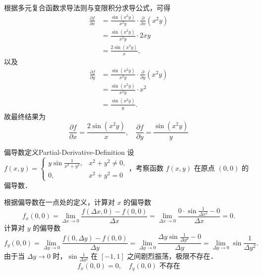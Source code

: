 \begin{solution}
    根据多元复合函数求导法则与变限积分求导公式，可得
    \begin{equation}
        \begin{aligned}
            \frac{\partial f}{\partial x} & = \frac{\sin(x^2 y)}{x^2 y} \cdot \frac{\partial}{\partial x}(x^2 y) \\
                                          & = \frac{\sin(x^2 y)}{x^2 y} \cdot 2xy                                \\
                                          & = \frac{2 \sin(x^2 y)}{x},
        \end{aligned}
    \end{equation}
    以及
    \begin{equation}
        \begin{aligned}
            \frac{\partial f}{\partial y} & = \frac{\sin(x^2 y)}{x^2 y} \cdot \frac{\partial}{\partial y}(x^2 y) \\
                                          & = \frac{\sin(x^2 y)}{x^2 y} \cdot x^2                                \\
                                          & = \frac{\sin(x^2 y)}{y}.
        \end{aligned}
    \end{equation}
    故最终结果为
    \begin{equation}
        \boxed{\frac{\partial f}{\partial x} = \frac{2 \sin(x^2 y)}{x}, \quad \frac{\partial f}{\partial y} = \frac{\sin(x^2 y)}{y}}
    \end{equation}
\end{solution}


\begin{problem}{偏导数定义}{Partial-Derivative-Definition}
    设 $f(x, y) = \begin{cases} y \sin \frac{1}{x^2+y^2}, & x^2 + y^2 \neq 0, \\ 0, & x^2 + y^2 = 0 \end{cases}$，考察函数 $f(x, y)$ 在原点 $(0, 0)$ 的偏导数．
\end{problem}

\begin{solution}
    根据偏导数在一点处的定义，计算对 $x$ 的偏导数
    \begin{equation}
        f_x(0, 0) = \lim_{\Delta x \to 0} \frac{f(\Delta x, 0) - f(0, 0)}{\Delta x} = \lim_{\Delta x \to 0} \frac{0 \cdot \sin \frac{1}{\Delta x^2} - 0}{\Delta x} = 0.
    \end{equation}
    计算对 $y$ 的偏导数
    \begin{equation}
        f_y(0, 0) = \lim_{\Delta y \to 0} \frac{f(0, \Delta y) - f(0, 0)}{\Delta y} = \lim_{\Delta y \to 0} \frac{\Delta y \sin \frac{1}{\Delta y^2} - 0}{\Delta y} = \lim_{\Delta y \to 0} \sin \frac{1}{\Delta y^2}.
    \end{equation}
    由于当 $\Delta y \to 0$ 时，$\sin \frac{1}{\Delta y^2}$ 在 $[-1, 1]$ 之间剧烈振荡，极限不存在．
    \begin{equation}
        \boxed{f_x(0, 0) = 0, \quad f_y(0, 0) \text{ 不存在}}
    \end{equation}
\end{solution}


